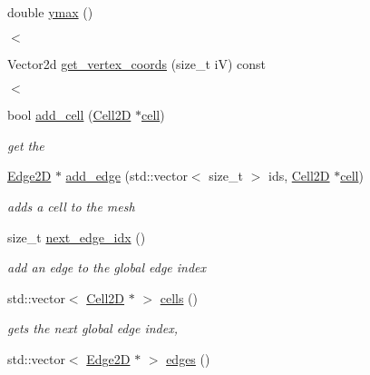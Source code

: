 \begin{DoxyCompactItemize}
double \hyperlink{classMeshFramework2D_1_1Mesh2D_a5d6820e4ddbd10a692ddca49ac4d6ad3}{ymax} ()
\begin{DoxyCompactList}\small\item\em $<$ \end{DoxyCompactList}\item 
Vector2d \hyperlink{classMeshFramework2D_1_1Mesh2D_a66b317b0a3cfba8a1935928db560957f}{get\+\_\+vertex\+\_\+coords} (size\+\_\+t iV) const
\begin{DoxyCompactList}\small\item\em $<$ \end{DoxyCompactList}\item 
bool \hyperlink{classMeshFramework2D_1_1Mesh2D_aba42962d8cadef92d2d1e6dbfc885646}{add\+\_\+cell} (\hyperlink{classMeshFramework2D_1_1Cell2D}{Cell2D} $\ast$\hyperlink{classMeshFramework2D_1_1Mesh2D_a1d8c40ea85f0abe3ae5aea23e4a95583}{cell})
\begin{DoxyCompactList}\small\item\em get the \end{DoxyCompactList}\item 
\hyperlink{classMeshFramework2D_1_1Edge2D}{Edge2D} $\ast$ \hyperlink{classMeshFramework2D_1_1Mesh2D_acfd90ef8444c8f09ec9fbe09f0914c52}{add\+\_\+edge} (std\+::vector$<$ size\+\_\+t $>$ ids, \hyperlink{classMeshFramework2D_1_1Cell2D}{Cell2D} $\ast$\hyperlink{classMeshFramework2D_1_1Mesh2D_a1d8c40ea85f0abe3ae5aea23e4a95583}{cell})
\begin{DoxyCompactList}\small\item\em adds a cell to the mesh \end{DoxyCompactList}\item 
size\+\_\+t \hyperlink{classMeshFramework2D_1_1Mesh2D_a42b47ccc676b53d9aa5b11209427be57}{next\+\_\+edge\+\_\+idx} ()
\begin{DoxyCompactList}\small\item\em add an edge to the global edge index \end{DoxyCompactList}\item 
std\+::vector$<$ \hyperlink{classMeshFramework2D_1_1Cell2D}{Cell2D} $\ast$ $>$ \hyperlink{classMeshFramework2D_1_1Mesh2D_ae886af87d932c7584d2e75c0e73cb01e}{cells} ()
\begin{DoxyCompactList}\small\item\em gets the next global edge index, \end{DoxyCompactList}\item 
std\+::vector$<$ \hyperlink{classMeshFramework2D_1_1Edge2D}{Edge2D} $\ast$ $>$ \hyperlink{classMeshFramework2D_1_1Mesh2D_a63b60ba84e079a7982b82b18ce5192f5}{edges} ()

\end{DoxyCompactItemize}
